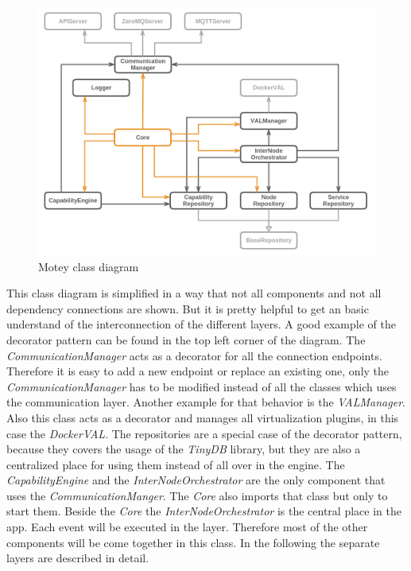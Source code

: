 \begin{figure}[H]
    \centering
    \includegraphics[width=\textwidth]{resources/images/class_diagram.png}
    \caption[Motey class diagram]{Motey class diagram}
    \label{fig:motey_class_diagram}
\end{figure}

This class diagram is simplified in a way that not all components and not all dependency connections are shown.
But it is pretty helpful to get an basic understand of the interconnection of the different layers.
A good example of the decorator pattern can be found in the top left corner of the diagram.
The \textit{CommunicationManager} acts as a decorator for all the connection endpoints.
Therefore it is easy to add a new endpoint or replace an existing one, only the \textit{CommunicationManager} has to be modified instead of all the classes which uses the communication layer.
Another example for that behavior is the \textit{VALManager}.
Also this class acts as a decorator and manages all virtualization plugins, in this case the \textit{DockerVAL}.
The repositories are a special case of the decorator pattern, because they covers the usage of the \textit{TinyDB} library, but they are also a centralized place for using them instead of all over in the engine.
The \textit{CapabilityEngine} and the \textit{InterNodeOrchestrator} are the only component that uses the \textit{CommunicationManger}.
The \textit{Core} also imports that class but only to start them.
Beside the \textit{Core} the \textit{InterNodeOrchestrator} is the central place in the app.
Each event will be executed in the layer.
Therefore most of the other components will be come together in this class.
In the following the separate layers are described in detail.


